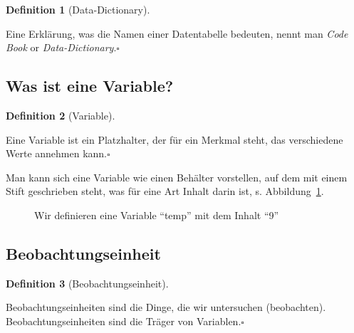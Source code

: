\documentclass[
  letterpaper,
]{scrbook}
\theoremstyle{definition}
\theoremstyle{definition}
\newtheorem{definition}{Definition}[chapter]
\theoremstyle{definition}
\theoremstyle{remark}
\begin{document}
\begin{definition}[Data-Dictionary]\protect\hypertarget{def-datadict}{}\label{def-datadict}

Eine Erklärung, was die Namen einer Datentabelle bedeuten, nennt man
\emph{Code Book} or \emph{Data-Dictionary}.\(\square\)

\end{definition}

\subsection{Was ist eine Variable?}\label{was-ist-eine-variable}

\begin{definition}[Variable]\protect\hypertarget{def-var}{}\label{def-var}

Eine Variable ist ein Platzhalter, der für ein Merkmal steht, das
verschiedene Werte annehmen kann.\(\square\)

\end{definition}

Man kann sich eine Variable wie einen Behälter vorstellen, auf dem mit
einem Stift geschrieben steht, was für eine Art Inhalt darin ist, s.
Abbildung~\ref{fig-var-zuweisen}.

\begin{figure}


\caption{\label{fig-var-zuweisen}Wir definieren eine Variable ``temp''
mit dem Inhalt ``9''}

\end{figure}%

\subsection{Beobachtungseinheit}\label{beobachtungseinheit}

\begin{definition}[Beobachtungseinheit]\protect\hypertarget{def-beobeinheit}{}\label{def-beobeinheit}

Beobachtungseinheiten sind die Dinge, die wir untersuchen (beobachten).
Beobachtungseinheiten sind die Träger von Variablen.\(\square\)

\end{definition}
\end{document}
